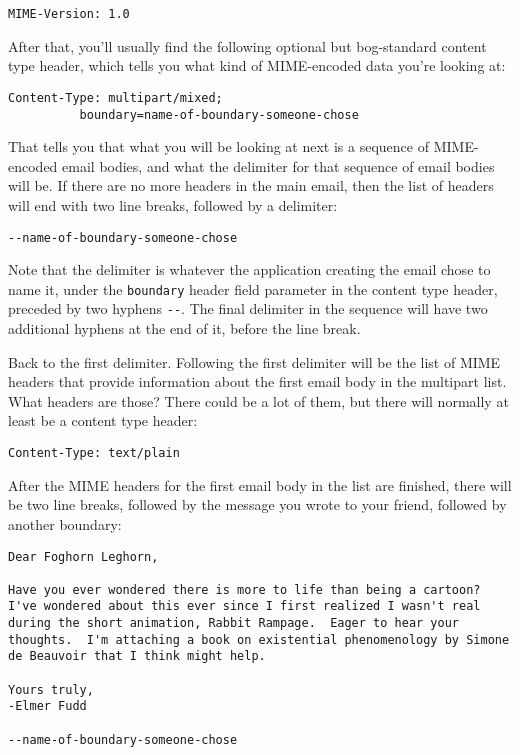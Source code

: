 \documentclass[11pt]{article}
\begin{document}
\begin{verbatim}
MIME-Version: 1.0
\end{verbatim}

After that, you'll usually find the following optional but
bog-standard content type header, which tells you what kind of
MIME-encoded data you're looking at:

\begin{verbatim}
Content-Type: multipart/mixed; 
          boundary=name-of-boundary-someone-chose
\end{verbatim}

That tells you that what you will be looking at next is a sequence of
MIME-encoded email bodies, and what the delimiter for that sequence of
email bodies will be.  If there are no more headers in the main email,
then the list of headers will end with two line breaks, followed by a
delimiter:

\begin{verbatim}
--name-of-boundary-someone-chose
\end{verbatim}

Note that the delimiter is whatever the application creating the email
chose to name it, under the \texttt{boundary} header field parameter in the
content type header, preceded by two hyphens \texttt{-{}-{}}.  The final
delimiter in the sequence will have two additional hyphens at the end
of it, before the line break.

Back to the first delimiter.  Following the first delimiter will be
the list of MIME headers that provide information about the first
email body in the multipart list. What headers are those?  There could
be a lot of them, but there will normally at least be a content type
header:

\begin{verbatim}
Content-Type: text/plain
\end{verbatim}

After the MIME headers for the first email body in the list are
finished, there will be two line breaks, followed by the message you
wrote to your friend, followed by another boundary:

\begin{verbatim}
Dear Foghorn Leghorn,

Have you ever wondered there is more to life than being a cartoon?
I've wondered about this ever since I first realized I wasn't real
during the short animation, Rabbit Rampage.  Eager to hear your
thoughts.  I'm attaching a book on existential phenomenology by Simone
de Beauvoir that I think might help.

Yours truly,
-Elmer Fudd

--name-of-boundary-someone-chose
\end{verbatim}
\end{document}
